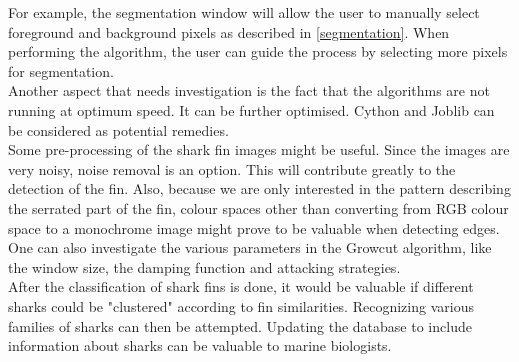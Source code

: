 \documentclass[a4paper,10pt]{article}
\begin{document}
For example, the segmentation window will allow the user to manually select foreground and background pixels as described in \ref{segmentation}.
When performing the algorithm, the user can guide the process by selecting more pixels for segmentation. \\

Another aspect that needs investigation is the fact that the algorithms are not
running at optimum speed.  It can be further optimised.  Cython and Joblib can be considered
as potential remedies. \\

Some pre-processing of the shark fin images might be useful.  Since the images are very noisy, 
noise removal is an option.  This will contribute greatly to the detection of the fin.  Also, because we are only interested in the pattern describing the serrated part
of the fin, colour spaces other than converting from RGB colour space to a monochrome image might prove to be valuable when detecting edges.  \\

One can also investigate the various parameters in the Growcut algorithm, like the window size, the damping function and attacking strategies. \\

After the classification of shark fins is done, it would be valuable if different sharks could be "clustered" according to fin similarities.
Recognizing various families of sharks can then be attempted.  Updating the database to include information about sharks can be valuable to marine biologists.  \\

\newpage

\end{document}
